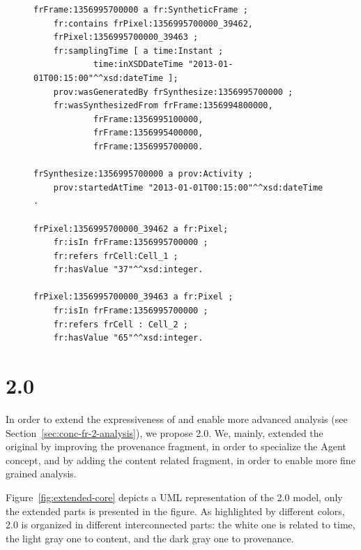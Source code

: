 \begin{figure}[t]
\begin{minipage}{0.95\linewidth}
\begin{lstlisting}[label={lst:synthetic-debs}, caption={Fragment of the model that represents a \textsc{SytheticFrame}}, style=N3]
frFrame:1356995700000 a fr:SyntheticFrame ;
    fr:contains frPixel:1356995700000_39462, 
    frPixel:1356995700000_39463 ;
    fr:samplingTime [ a time:Instant ; 
    		time:inXSDDateTime "2013-01-01T00:15:00"^^xsd:dateTime ];
    prov:wasGeneratedBy frSynthesize:1356995700000 ;
    fr:wasSynthesizedFrom frFrame:1356994800000, 
    		frFrame:1356995100000, 
            frFrame:1356995400000, 
            frFrame:1356995700000. 

frSynthesize:1356995700000 a prov:Activity ;
	prov:startedAtTime "2013-01-01T00:15:00"^^xsd:dateTime .

frPixel:1356995700000_39462 a fr:Pixel;
    fr:isIn frFrame:1356995700000 ;
    fr:refers frCell:Cell_1 ;
    fr:hasValue "37"^^xsd:integer.

frPixel:1356995700000_39463 a fr:Pixel ;
    fr:isIn frFrame:1356995700000 ;
    fr:refers frCell : Cell_2 ;
    fr:hasValue "65"^^xsd:integer.
\end{lstlisting}
\end{minipage}
\end{figure} 

\section{\frappe{} 2.0} \label{sec:conc-fr-2}
In order to extend the expressiveness of \frappe{} and enable more advanced analysis (see Section~\ref{sec:conc-fr-2-analysis}), we propose \frappe{} 2.0.
We, mainly, extended the original \frappe{} by improving the provenance fragment, in order to specialize the \textsf{Agent} concept, and by adding the content related fragment, in order to enable more fine grained analysis. 

Figure~\ref{fig:extended-core} depicts a UML representation of the \frappe{} 2.0 model, only the extended parts is presented in the figure.
As highlighted by different colors, \frappe{} 2.0 is organized in different interconnected parts: the white one is related to time, the light gray one to content, and the dark gray one to provenance. 

